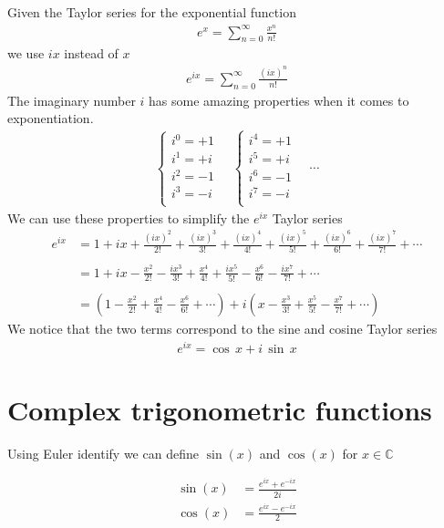 \documentclass{article}
\begin{document}
Given the Taylor series for the exponential function
\begin{align*}
	e^x=\sum_{n=0}^{\infty}\frac{x^n}{n!}
\end{align*}
we use \(ix\) instead of \(x\)
\begin{align*}
	e^{ix}=\sum_{n=0}^{\infty}\frac{{(ix)}^n}{n!}
\end{align*}
The imaginary number \(i\) has some amazing properties when it comes to exponentiation.
\begin{align*}
	\begin{cases}
		i^0=+1\\
		i^1=+i\\
		i^2=-1\\
		i^3=-i\\
	\end{cases}
	\quad
	\begin{cases}
		i^4=+1\\
		i^5=+i\\
		i^6=-1\\
		i^7=-i\\
	\end{cases}
	\quad
	\cdots
\end{align*}
We can use these properties to simplify the \(e^{ix}\) Taylor series
\begin{align*}
	e^{ix}
	&   =1
		+ix
		+\frac{{(ix)}^2}{2!}
		+\frac{{(ix)}^3}{3!}
		+\frac{{(ix)}^4}{4!}
		+\frac{{(ix)}^5}{5!}
		+\frac{{(ix)}^6}{6!}
		+\frac{{(ix)}^7}{7!}
		+\cdots
	\\
	\\
	&   =1
		+ix
		-\frac{x^2}{2!}
		-\frac{ix^3}{3!}
		+\frac{x^4}{4!}
		+\frac{ix^5}{5!}
		-\frac{x^6}{6!}
		-\frac{ix^7}{7!}
		+\cdots
	\\
	\\
	&=
	\left(
		1
		-\frac{x^2}{2!}
		+\frac{x^4}{4!}
		-\frac{x^6}{6!}
		+\cdots
	\right)
	+i
	\left(
		x
		-\frac{x^3}{3!}
		+\frac{x^5}{5!}
		-\frac{x^7}{7!}
		+\cdots
	\right)
\end{align*}
We notice that the two terms correspond to the sine and cosine Taylor series
\begin{align*}
	e^{ix}=\cos\,x+i\,\sin\,x
\end{align*}

\pagebreak

\section{Complex trigonometric functions}

Using Euler identify we can define \(\sin(x)\) and \(\cos(x)\) for \(x \in \mathbb{C}\)

\begin{align*}
	\sin(x)&=\frac{e^{ix}+e^{-ix}}{2i} \\
	\cos(x)&=\frac{e^{ix}-e^{-ix}}{2}
\end{align*}
\end{document}
